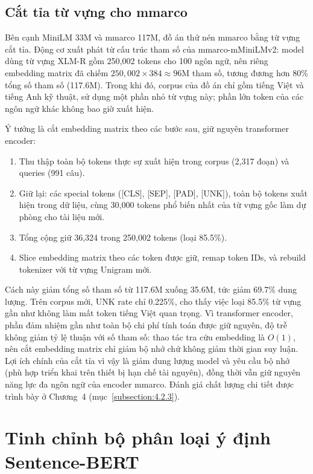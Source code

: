 \documentclass[../DoAn.tex]{subfiles}
\begin{document}
\subsection{Cắt tỉa từ vựng cho mmarco}
\label{subsection:3.8.5}

Bên cạnh MiniLM 33M và mmarco 117M, đồ án thử nén mmarco bằng từ vựng cắt tỉa. Động cơ xuất phát từ cấu trúc tham số của mmarco-mMiniLMv2: model dùng từ vựng XLM-R gồm 250,002 tokens cho 100 ngôn ngữ, nên riêng embedding matrix đã chiếm $250{,}002 \times 384 \approx 96$M tham số, tương đương hơn 80\% tổng số tham số (117.6M). Trong khi đó, corpus của đồ án chỉ gồm tiếng Việt và tiếng Anh kỹ thuật, sử dụng một phần nhỏ từ vựng này; phần lớn token của các ngôn ngữ khác không bao giờ xuất hiện.

Ý tưởng là cắt embedding matrix theo các bước sau, giữ nguyên transformer encoder:

\begin{enumerate}
    \item Thu thập toàn bộ tokens thực sự xuất hiện trong corpus (2,317 đoạn) và queries (991 câu).
    \item Giữ lại: các special tokens ([CLS], [SEP], [PAD], [UNK]), toàn bộ tokens xuất hiện trong dữ liệu, cùng 30,000 tokens phổ biến nhất của từ vựng gốc làm dự phòng cho tài liệu mới.
    \item Tổng cộng giữ 36,324 trong 250,002 tokens (loại 85.5\%).
    \item Slice embedding matrix theo các token được giữ, remap token IDs, và rebuild tokenizer với từ vựng Unigram mới.
\end{enumerate}

Cách này giảm tổng số tham số từ 117.6M xuống 35.6M, tức giảm 69.7\% dung lượng. Trên corpus mới, UNK rate chỉ 0.225\%, cho thấy việc loại 85.5\% từ vựng gần như không làm mất token tiếng Việt quan trọng. Vì transformer encoder, phần đảm nhiệm gần như toàn bộ chi phí tính toán được giữ nguyên, độ trễ không giảm tỷ lệ thuận với số tham số: thao tác tra cứu embedding là $O(1)$, nên cắt embedding matrix chỉ giảm bộ nhớ chứ không giảm thời gian suy luận. Lợi ích chính của cắt tỉa vì vậy là giảm dung lượng model và yêu cầu bộ nhớ (phù hợp triển khai trên thiết bị hạn chế tài nguyên), đồng thời vẫn giữ nguyên năng lực đa ngôn ngữ của encoder mmarco. Đánh giá chất lượng chi tiết được trình bày ở Chương~4 (mục~\ref{subsection:4.2.3}).

\section{Tinh chỉnh bộ phân loại ý định Sentence-BERT}
\label{section:3.9}
\end{document}
